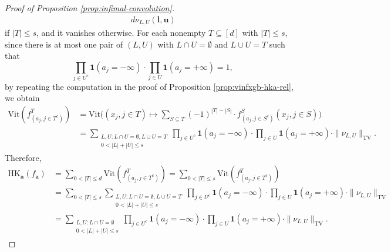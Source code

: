 \documentclass[10pt]{article}
\newcommand{\vit}{{\text{Vit}}}
\newcommand{\hk}{{\text{HK}}}
\newcommand{\lbf}{{\mathbf{l}}}
\newcommand{\ubf}{{\mathbf{u}}}
\newcommand{\abf}{{\mathbf{a}}}
\newcommand{\ind}{{\mathbf{1}}}
\begin{document}
\begin{proof}[Proof of Proposition \ref{prop:infimal-convolution}]
\begin{equation*}
\begin{aligned}
    \, d\nu_{L, U}(\lbf, \ubf)
\end{aligned}
\end{equation*}
if $|T| \le s$, and it vanishes otherwise.
For each nonempty $T \subseteq [d]$ with $|T| \le s$, since there is at 
most one pair of $(L, U)$ with $L \cap U = \emptyset$ and
$L \cup U = T$ such that
\begin{equation*}
    \prod_{j \in U^c} \ind(a_j = -\infty)
    \cdot \prod_{j \in U} \ind(a_j = +\infty) = 1,
\end{equation*}
by repeating the computation in the proof of 
Proposition \ref{prop:vinfxgb-hka-rel}, we obtain
\begin{equation*}
\begin{aligned}
    \vit(f^T_{(a_j, j \in T^c)}) 
    &= \vit\Big((x_j, j \in T) \mapsto \sum_{S \subseteq T} (-1)^{|T| - |S|} 
    \cdot f^S_{(a_j, j \in S^c)}(x_j, j \in S)\Big) \\
    &= \sum_{\substack{L, U: L \cap U = \emptyset, L \cup U = T \\
    0 < |L| + |U| \leq s }}
    \prod_{j \in U^c} \ind(a_j = -\infty)
    \cdot \prod_{j \in U} \ind(a_j = +\infty) 
    \cdot \|\nu_{L, U}\|_{\text{TV}}.
\end{aligned}
\end{equation*}
Therefore,
\begin{equation*}
\begin{aligned}
    \hk_{\abf}(f_{\abf}) 
    &= \sum_{0 < |T| \le d} \vit(f^T_{(a_j, j \in T^c)}) 
    = \sum_{0 < |T| \le s} \vit(f^T_{(a_j, j \in T^c)}) \\
    &= \sum_{0 < |T| \le s} 
    \sum_{\substack{L, U: L \cap U = \emptyset, L \cup U = T \\
    0 < |L| + |U| \leq s }}
    \prod_{j \in U^c} \ind(a_j = -\infty)
    \cdot \prod_{j \in U} \ind(a_j = +\infty) 
    \cdot \|\nu_{L, U}\|_{\text{TV}} \\
    &= \sum_{\substack{L, U: L \cap U = \emptyset \\
    0 < |L| + |U| \leq s }}
    \prod_{j \in U^c} \ind(a_j = -\infty)
    \cdot \prod_{j \in U} \ind(a_j = +\infty) 
    \cdot \|\nu_{L, U}\|_{\text{TV}}.
\end{aligned}
\end{equation*}


\end{proof}
\end{document}
